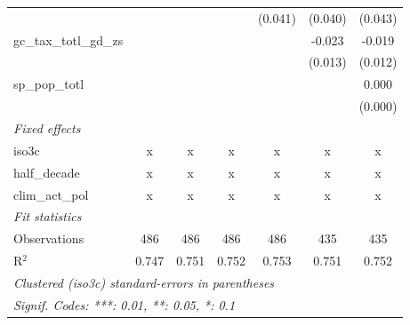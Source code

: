 \begin{tabular}{lcccccc}
                                               &               &                &                & (0.041)        & (0.040)        & (0.043)\\   
   gc\_tax\_totl\_gd\_zs                       &               &                &                &                & -0.023         & -0.019\\   
                                               &               &                &                &                & (0.013)        & (0.012)\\   
   sp\_pop\_totl                               &               &                &                &                &                & 0.000\\   
                                               &               &                &                &                &                & (0.000)\\   
   \emph{Fixed effects}\\
   iso3c                                       & x             & x              & x              & x              & x              & x\\  
   half\_decade                                & x             & x              & x              & x              & x              & x\\  
   clim\_act\_pol                              & x             & x              & x              & x              & x              & x\\  
   \midrule \emph{Fit statistics}\\
   Observations                                & 486           & 486            & 486            & 486            & 435            & 435\\  
   R$^2$                                       & 0.747         & 0.751          & 0.752          & 0.753          & 0.751          & 0.752\\  
   \midrule
   \multicolumn{7}{l}{\emph{Clustered (iso3c) standard-errors in parentheses}}\\
   \multicolumn{7}{l}{\emph{Signif. Codes: ***: 0.01, **: 0.05, *: 0.1}}\\
\end{tabular}
\par\endgroup


